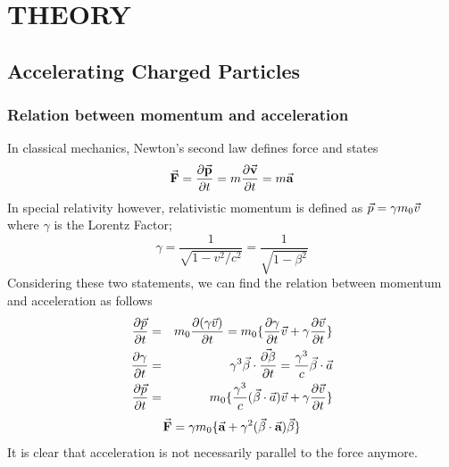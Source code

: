 \documentclass[a4paper,oneside,12pt]{report}
\numberwithin{equation}{chapter}
\begin{document}
\newcommand{\fromsec}[1]{\textit{section \ref{sec:#1}}}
\newcommand{\fromsecs}[2]{\textit{sections \ref{sec:#1} and \ref{sec:#2}}}

\newcommand{\fromapp}[1]{\textit{Appendix \ref{appendix:#1}}}

\newcommand{\fromtab}[1]{\textit{Table \ref{tab:#1}}}
\newcommand{\fromtabs}[2]{\textit{Tables \ref{tab:#1} and \ref{tab:#2}}}
\newcommand{\fromtabf}[4]{\textit{Tables \ref{tab:#1}, \ref{tab:#2}, \ref{tab:#3} and \ref{tab:#4}}}



\chapter{THEORY}

\section{Accelerating Charged Particles}

\subsection{Relation between momentum and acceleration}
In classical mechanics, Newton's second law defines force and states 
\begin{equation} \label{eq:newton_second_law}
    \vec{\textbf{F}} = \frac{\partial \vec{\textbf{p}}}{\partial t} = m \frac{\partial \vec{\textbf{v}}}{\partial t} = m \vec{\textbf{a}}
\end{equation}
In special relativity however, relativistic momentum is defined as $\vec{p} = \gamma m_0 \vec{v} $ where $\gamma$ is the Lorentz Factor;
\begin{equation*}
    \gamma = \frac{1}{\sqrt{1-v^2 / c^2}} = \frac{1}{\sqrt{1-\beta^2}}
\end{equation*}
Considering these two statements, we can find the relation between momentum and acceleration as follows
\begin{eqnarray*}
    \frac{\partial \vec{p}}{\partial t} &=& m_0 \frac{\partial (\gamma \vec{v})}{\partial t} = m_0 \{  \frac{\partial \gamma}{\partial t}\vec{v} + \gamma \frac{\partial \vec{v}}{\partial t}  \} \\
    \frac{\partial \gamma}{\partial t} &=& \gamma^3 \vec{\beta} \cdot \vec{\frac{\partial \beta}{\partial t}} = \frac{\gamma^3}{c} \vec{\beta} \cdot \vec{a} \\
    \frac{\partial \vec{p}}{\partial t}  &=& m_0 \{   \frac{\gamma^3}{c} (\vec{\beta} \cdot \vec{a} )\vec{v} + \gamma \frac{\partial \vec{v}}{\partial t}  \} 
\end{eqnarray*}
\begin{equation} \label{eq:Frel}
    \vec{\textbf{F}}  = \gamma m_0 \{ \vec{\textbf{a}} + \gamma^2(\vec{\beta} \cdot \vec{\textbf{a}})\vec{\beta} \}
\end{equation}
It is clear that acceleration is not necessarily parallel to the force anymore. 
\end{document}
